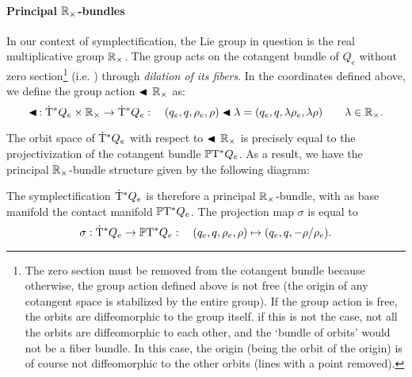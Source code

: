 \paragraph{Principal \texorpdfstring{\(\mathbb{R}_{\times}\)}{R}-bundles} In our context of symplectification, the Lie group in question is the real multiplicative group \(\mathbb{R}_{\times}\). The group acts on the cotangent bundle of \(Q_e\) without zero section\footnote
{
    The zero section must be removed from the cotangent bundle because otherwise, the group action defined above is not free (the origin of any cotangent space is stabilized by the entire group). If the group action is free, the orbits are diffeomorphic to the group itself. if this is not the case, not all the orbits are diffeomorphic to each other, and the `bundle of orbits' would not be a fiber bundle. In this case, the origin (being the orbit of the origin) is of course not diffeomorphic to the other orbits (lines with a point removed).
}
(i.e. ) through \emph{dilation of its fibers}. In the coordinates defined above, we define the group action \(\blacktriangleleft\,\mathbb{R}_{\times}\) as:
\begin{equation}
     \blacktriangleleft\,: \mathrm{\dot{T}}^*Q_e\times\mathbb{R}_{\times} \to \mathrm{\dot{T}}^*Q_e : \quad (q_e, q, \rho_e, \rho) \blacktriangleleft \lambda = (q_e, q, \lambda \rho_e, \lambda \rho ) \qquad \lambda \in \mathbb{R}_{\times}.
\end{equation}

The orbit space of \(\mathrm{\dot{T}}^*Q_e\) with respect to \(\blacktriangleleft\,\mathbb{R}_{\times}\) is precisely equal to the projectivization of the cotangent bundle \(\mathbb{P}\mathrm{T}^* Q_e\). As a result, we have the principal \(\mathbb{R}_{\times}\)-bundle structure given by the following diagram:
\begin{center}
\end{center}

The symplectification \(\mathrm{\dot{T}}^*Q_e\) is therefore a principal \(\mathbb{R}_{\times}\)-bundle, with as base manifold the contact manifold \(\mathbb{P}\mathrm{T}^* Q_e\). The projection map \(\sigma\) is equal to
\begin{equation}
     \sigma: \mathrm{\dot{T}}^*Q_e \to \mathbb{P}\mathrm{T}^* Q_e: \quad (q_e, q, \rho_e, \rho) \mapsto (q_e, q, -\rho/\rho_e).
\end{equation}

